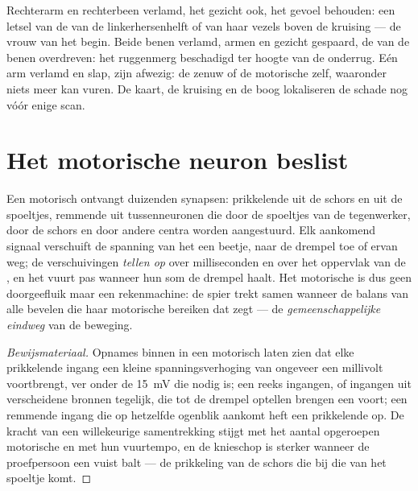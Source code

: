 \begin{example}\label{ex:g12:brain-and-movement:paralysis}
Rechterarm en rechterbeen verlamd, het gezicht ook, het gevoel behouden:
een letsel van de  van de linkerhersenhelft of van haar
vezels boven de kruising --- de vrouw van het begin. Beide benen verlamd,
armen en gezicht gespaard, de  van de benen overdreven: het
ruggenmerg beschadigd ter hoogte van de onderrug. Eén arm verlamd en slap,
zijn  afwezig: de zenuw of de motorische  zelf, waaronder
niets meer kan vuren. De kaart, de kruising en de boog lokaliseren de
schade nog vóór enige scan.
\end{example}

\section{Het motorische neuron beslist}

\begin{proposition}\label{prop:g12:brain-and-movement:integration}
Een motorisch  ontvangt duizenden synapsen: prikkelende uit de
schors en uit de spoeltjes, remmende uit tussenneuronen die door de
spoeltjes van de tegenwerker, door de schors en door andere centra worden
aangestuurd. Elk aankomend signaal verschuift de spanning van het 
een beetje, naar de drempel toe of ervan weg; de verschuivingen
\emph{tellen op} over milliseconden en over het oppervlak van de , en
het  vuurt pas wanneer hun som de drempel haalt. Het motorische
 is dus geen doorgeefluik maar een rekenmachine: de spier trekt
samen wanneer de balans van alle bevelen die haar motorische 
bereiken dat zegt --- de \emph{gemeenschappelijke
eindweg} van de beweging.
\end{proposition}
\begin{proof}[Bewijsmateriaal]
Opnames binnen in een motorisch  laten zien dat elke prikkelende
ingang een kleine spanningsverhoging van ongeveer een millivolt
voortbrengt, ver onder de \qty{15}{mV} die nodig is; een reeks ingangen,
of ingangen uit verscheidene bronnen tegelijk, die tot de drempel optellen
brengen een  voort; een remmende ingang die op hetzelfde
ogenblik aankomt heft een prikkelende op. De kracht van een willekeurige
samentrekking stijgt met het aantal opgeroepen motorische  en met
hun vuurtempo, en de knieschop is sterker wanneer de proefpersoon een
vuist balt --- de prikkeling van de schors die bij die van het spoeltje
komt.
\end{proof}

